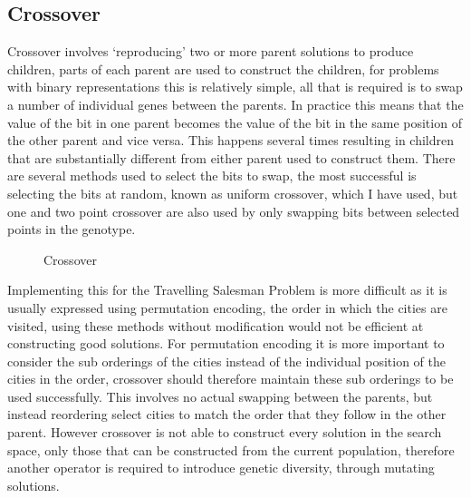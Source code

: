 \documentclass[]{final_report}
\begin{document}
\newpage
\subsection*{Crossover}

Crossover involves `reproducing' two or more parent solutions to produce children, parts of each parent are used to construct the children, for problems with binary representations this is relatively simple, all that is required is to swap a number of individual genes between the parents. In practice this means that the value of the bit in one parent becomes the value of the bit in the same position of the other parent and vice versa. This happens several times resulting in children that are substantially different from either parent used to construct them. There are several methods used to select the bits to swap, the most successful is selecting the bits at random, known as uniform crossover, which I have used, but one and two point crossover are also used by only swapping bits between selected points in the genotype.

\begin{figure}[h]
	\centering
	\fboxsep 2mm
	\caption{\label{fig:crossover} Crossover}
\end{figure}

Implementing this for the Travelling Salesman Problem is more difficult as it is usually expressed using permutation encoding, the order in which the cities are visited, using these methods without modification would not be efficient at constructing good solutions. For permutation encoding it is more important to consider the sub orderings of the cities instead of the individual position of the cities in the order\cite{siarry:2016}, crossover should therefore maintain these sub orderings to be used successfully. This involves no actual swapping between the parents, but instead reordering select cities to match the order that they follow in the other parent. However crossover is not able to construct every solution in the search space, only those that can be constructed from the current population, therefore another operator is required to introduce genetic diversity, through mutating solutions\cite{luke:2013}.
\end{document}
